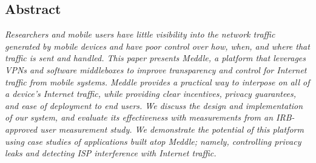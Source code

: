 \subsection*{Abstract}
{\it Researchers and mobile users have little visibility into the network 
traffic generated by  mobile devices and have poor control over 
how, when, and where that traffic is sent and handled. 
This paper presents Meddle, a platform that  leverages 
VPNs and software middleboxes to improve transparency and control 
for Internet traffic from mobile systems. Meddle provides a practical way to 
interpose on all of a device's Internet traffic, while providing clear incentives, privacy guarantees, 
and ease of deployment to end users. We discuss 
the design and implementation of our system, and evaluate its effectiveness with  
measurements from an IRB-approved user measurement study. We demonstrate the 
potential of this platform using case studies of applications built atop Meddle; namely,
controlling privacy leaks and detecting ISP interference with 
Internet traffic.
}







